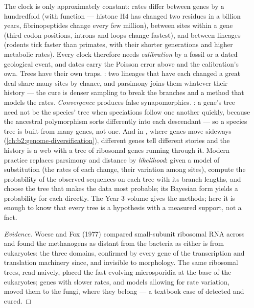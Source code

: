 \begin{proposition}\label{prop:b2:phylogenetic-trees:pitfalls}
The clock is only approximately constant: rates differ between
genes by a hundredfold (with function --- histone H4 has changed
two residues in a billion years, fibrinopeptides change every few
million), between sites within a gene (third codon positions,
introns and loops change fastest), and between lineages (rodents
tick faster than primates, with their shorter generations and
higher metabolic rates). Every clock therefore needs
\emph{calibration} by a fossil or a dated geological event, and
dates carry the Poisson error above and the calibration's own.
Trees have their own traps. \emph{}: two
lineages that have each changed a great deal share many sites by
chance, and parsimony joins them whatever their history --- the
cure is denser sampling to break the branches and a method that
models the rates. \emph{Convergence} produces false synapomorphies.
\emph{}: a gene's tree need not be the
species' tree when speciations follow one another quickly, because
the ancestral polymorphism sorts differently into each descendant
--- so a species tree is built from many genes, not one. And in
, where genes move sideways
(\cref{ch:b2:genome-diversification}), different genes tell
different stories and the history is a web with a tree of ribosomal
genes running through it. Modern practice replaces parsimony and
distance by \emph{likelihood}: given a model of substitution (the
rates of each change, their variation among sites), compute the
probability of the observed sequences on each tree with its branch
lengths, and choose the tree that makes the data most probable;
its Bayesian form yields a probability for each  directly.
The Year 3 volume gives the methods; here it is enough to know that
every tree is a hypothesis with a measured support, not a fact.
\end{proposition}
\begin{proof}[Evidence]
Woese and Fox (1977) compared small-subunit ribosomal RNA across
 and found the methanogens as distant from the bacteria
as either is from eukaryotes: the three domains, confirmed by every
gene of the transcription and translation machinery since, and
invisible to morphology. The same ribosomal trees, read naively,
placed the fast-evolving microsporidia at the base of the
eukaryotes; genes with slower rates, and models allowing for rate
variation, moved them to the fungi, where they belong --- a
textbook case of  detected and cured.
\end{proof}

